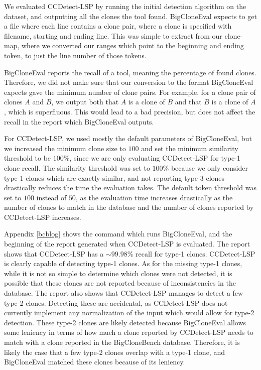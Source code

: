 We evaluated CCDetect-LSP by running the initial detection algorithm on the dataset, and
outputting all the clones the tool found. BigCloneEval expects to get a file where each
line contains a clone pair, where a clone is specified with filename, starting and
ending line. This was simple to extract from our clone-map, where we converted our ranges
which point to the beginning and ending token, to just the line number of those tokens.

BigCloneEval reports the recall of a tool, meaning the percentage of found clones.
Therefore, we did not make sure that our conversion to the format BigCloneEval expects
gave the minimum number of clone pairs. For example, for a clone pair of clones $A$ and
$B$, we output both that $A$ is a clone of $B$ and that $B$ is a clone of $A$, which is
superfluous. This would lead to a bad precision, but does not affect the recall in the
report which BigCloneEval outputs.

For CCDetect-LSP, we used mostly the default parameters of BigCloneEval, but we increased
the minimum clone size to $100$ and set the minimum similarity threshold to be $100\%$,
since we are only evaluating CCDetect-LSP for type-1 clone recall. The similarity
threshold was set to $100\%$ because we only consider type-1 clones which are exactly
similar, and not reporting type-3 clones drastically reduces the time the evaluation
takes. The default token threshold was set to $100$ instead of $50$, as the evaluation
time increases drastically as the number of clones to match in the database and the number
of clones reported by CCDetect-LSP increases.

Appendix \ref{bcblog} shows the command which runs BigCloneEval, and the beginning of the
report generated when CCDetect-LSP is evaluated. The report shows that CCDetect-LSP has a
${\sim}99.98\%$ recall for type-1 clones. CCDetect-LSP is clearly capable of detecting
type-1 clones. As for the missing type-1 clones, while it is not so simple to determine
which clones were not detected, it is possible that these clones are not reported because
of inconsistencies in the database. The report also shows that CCDetect-LSP manages to
detect a few type-2 clones. Detecting these are accidental, as CCDetect-LSP does not
currently implement any normalization of the input which would allow for type-2 detection.
These type-2 clones are likely detected because BigCloneEval allows some leniency in terms
of how much a clone reported by CCDetect-LSP needs to match with a clone reported in the
BigCloneBench database. Therefore, it is likely the case that a few type-2 clones overlap
with a type-1 clone, and BigCloneEval matched these clones because of its leniency.

